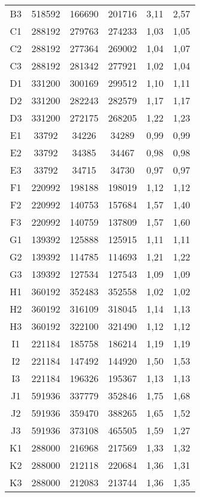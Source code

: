 \begin{center}
\begin{longtable}{cccccc}
    B3    & 518592 & 166690 & 201716 & 3,11  & 2,57 \\
    C1    & 288192 & 279763 & 274233 & 1,03  & 1,05 \\
    C2    & 288192 & 277364 & 269002 & 1,04  & 1,07 \\
    C3    & 288192 & 281342 & 277921 & 1,02  & 1,04 \\
    D1    & 331200 & 300169 & 299512 & 1,10  & 1,11 \\
    D2    & 331200 & 282243 & 282579 & 1,17  & 1,17 \\
    D3    & 331200 & 272175 & 268205 & 1,22  & 1,23 \\
    E1    & 33792 & 34226 & 34289 & 0,99  & 0,99 \\
    E2    & 33792 & 34385 & 34467 & 0,98  & 0,98 \\
    E3    & 33792 & 34715 & 34730 & 0,97  & 0,97 \\
    F1    & 220992 & 198188 & 198019 & 1,12  & 1,12 \\
    F2    & 220992 & 140753 & 157684 & 1,57  & 1,40 \\
    F3    & 220992 & 140759 & 137809 & 1,57  & 1,60 \\
    G1    & 139392 & 125888 & 125915 & 1,11  & 1,11 \\
    G2    & 139392 & 114785 & 114693 & 1,21  & 1,22 \\
    G3    & 139392 & 127534 & 127543 & 1,09  & 1,09 \\
    H1    & 360192 & 352483 & 352558 & 1,02  & 1,02 \\
    H2    & 360192 & 316109 & 318045 & 1,14  & 1,13 \\
    H3    & 360192 & 322100 & 321490 & 1,12  & 1,12 \\
    I1    & 221184 & 185758 & 186214 & 1,19  & 1,19 \\
    I2    & 221184 & 147492 & 144920 & 1,50  & 1,53 \\
    I3    & 221184 & 196326 & 195367 & 1,13  & 1,13 \\
    J1    & 591936 & 337779 & 352846 & 1,75  & 1,68 \\
    J2    & 591936 & 359470 & 388265 & 1,65  & 1,52 \\
    J3    & 591936 & 373108 & 465505 & 1,59  & 1,27 \\
    K1    & 288000 & 216968 & 217569 & 1,33  & 1,32 \\
    K2    & 288000 & 212118 & 220684 & 1,36  & 1,31 \\
    K3    & 288000 & 212083 & 213744 & 1,36  & 1,35 \\

\end{longtable}
\end{center}
